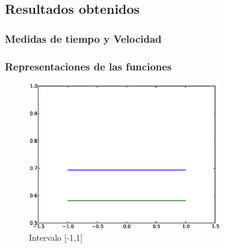 \documentclass{beamer}
\begin{document}
\subsection{Resultados obtenidos}
\begin{frame}
\frametitle{Medidas de tiempo y Velocidad}




\end{frame}
\begin{frame}


\end{frame}

\begin{frame}
\frametitle{Representaciones de las funciones}


\begin{figure}[!th]
\begin{center}
\includegraphics[width=0.75\textwidth]{1intervalo.eps}
\caption{Intervalo [-1,1]}
\label{fig:1}
\end{center}
\end{figure}
\end{frame}
\end{document}
